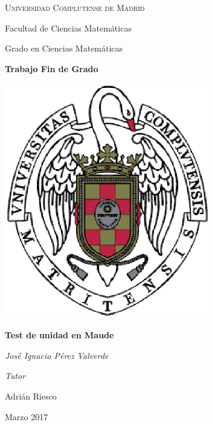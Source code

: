 \begin{titlepage}
	\centering
	{\scshape\large Universidad Complutense de Madrid \par
        Facultad de Ciencias Matemáticas \par
        Grado en Ciencias Matemáticas\par}
        \vspace{1cm}
	{\huge\bfseries Trabajo Fin de Grado\par}
        \vspace{2cm}
        {\includegraphics[width = 9cm]{ucm.ps}}
	\vspace{3cm}

	{\huge\bfseries Test de unidad en Maude\par}
        \vspace{0.5cm}
	{\Large\itshape José Ignacio Pérez Valverde\par}
	\vfill
        {\Large\itshape Tutor\par Adri\'an Riesco\par}
	\vfill
	{\large Marzo 2017\par}
\end{titlepage}
